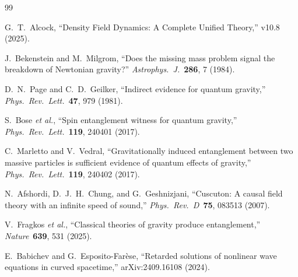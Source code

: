\documentclass[12pt,a4paper]{article}
\begin{document}
\begin{thebibliography}{99}

G.~T.~Alcock, ``Density Field Dynamics: A Complete Unified Theory,''
v10.8 (2025).

J.~Bekenstein and M.~Milgrom,
``Does the missing mass problem signal the breakdown of Newtonian gravity?''
\textit{Astrophys.~J.}~\textbf{286}, 7 (1984).

D.~N.~Page and C.~D.~Geilker,
``Indirect evidence for quantum gravity,''
\textit{Phys.~Rev.~Lett.}~\textbf{47}, 979 (1981).

S.~Bose \textit{et al.},
``Spin entanglement witness for quantum gravity,''
\textit{Phys.~Rev.~Lett.}~\textbf{119}, 240401 (2017).

C.~Marletto and V.~Vedral,
``Gravitationally induced entanglement between two massive particles is
sufficient evidence of quantum effects of gravity,''
\textit{Phys.~Rev.~Lett.}~\textbf{119}, 240402 (2017).

N.~Afshordi, D.~J.~H.~Chung, and G.~Geshnizjani,
``Cuscuton: A causal field theory with an infinite speed of sound,''
\textit{Phys.~Rev.~D}~\textbf{75}, 083513 (2007).

V.~Fragkos \textit{et al.},
``Classical theories of gravity produce entanglement,''
\textit{Nature}~\textbf{639}, 531 (2025).

E.~Babichev and G.~Esposito-Far\`{e}se,
``Retarded solutions of nonlinear wave equations in curved spacetime,''
arXiv:2409.16108 (2024).

\end{thebibliography}
\end{document}

